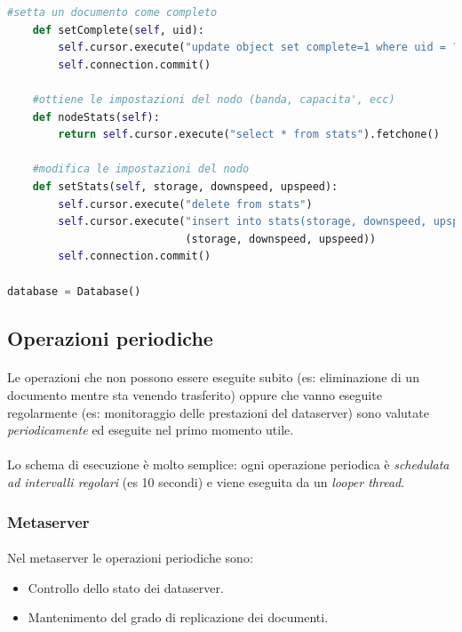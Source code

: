 \documentclass[11pt,a4paper,english]{article}
\begin{document}
\begin{lstlisting}[language=Python, title=Codice]
    #setta un documento come completo
    def setComplete(self, uid):
        self.cursor.execute("update object set complete=1 where uid = ?", (uid, ))
        self.connection.commit()

    #ottiene le impostazioni del nodo (banda, capacita', ecc)
    def nodeStats(self):
        return self.cursor.execute("select * from stats").fetchone()

    #modifica le impostazioni del nodo
    def setStats(self, storage, downspeed, upspeed):
        self.cursor.execute("delete from stats")
        self.cursor.execute("insert into stats(storage, downspeed, upspeed) values (?, ?, ?)",
                            (storage, downspeed, upspeed))
        self.connection.commit()

database = Database()
\end{lstlisting}


\subsection{Operazioni periodiche}

\paragraph{} Le operazioni che non possono essere eseguite subito (es: eliminazione di un documento mentre sta venendo trasferito) oppure che vanno eseguite regolarmente (es: monitoraggio delle prestazioni del dataserver) sono valutate \emph{periodicamente} ed eseguite nel primo momento utile. 

\paragraph{} Lo schema di esecuzione è molto semplice: ogni operazione periodica è \emph{schedulata ad intervalli regolari} (es 10 secondi) e viene eseguita da un \emph{looper thread}.

\subsubsection{Metaserver}

\paragraph{} Nel metaserver le operazioni periodiche sono:\begin{itemize}
	\item Controllo dello stato dei dataserver.
	\item Mantenimento del grado di replicazione dei documenti.
\end{itemize}
\end{document}

